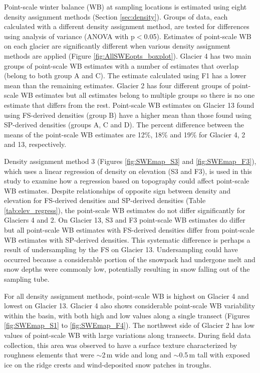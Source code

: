 \documentclass{sfuthesis}
\begin{document}
Point-scale winter balance (WB) at sampling locations is estimated using eight density assignment methods (Section \ref{sec:density}). Groups of data, each calculated with a different density assignment method, are tested for differences using analysis of variance (ANOVA with p$<$0.05). Estimates of point-scale WB on each glacier are significantly different when various density assignment methods are applied (Figure \ref{fig:AllSWEopts_boxplot}). Glacier 4 has two main groups of point-scale WB estimates with a number of estimates that overlap (belong to both group A and C). The estimate calculated using F1 has a lower mean than the remaining estimates. Glacier 2 has four different groups of point-scale WB estimates but all estimates belong to multiple groups so there is no one estimate that differs from the rest. Point-scale WB estimates on Glacier 13 found using FS-derived densities (group B) have a higher mean than those found using SP-derived densities (groups A, C and D). The percent difference between the means of the point-scale WB estimates are 12\%, 18\% and 19\%  for Glacier 4, 2 and 13, respectively. 

Density assignment method 3 (Figures \ref{fig:SWEmap_S3} and \ref{fig:SWEmap_F3}), which uses a linear regression of density on elevation (S3 and F3), is used in this study to examine how a regression based on topography could affect point-scale WB estimates. Despite relationships of opposite sign between density and elevation for FS-derived densities and SP-derived densities (Table \ref{tab:elev_regress}), the point-scale WB estimates do not differ significantly for Glaciers 4 and 2. On Glacier 13, S3 and F3 point-scale WB estimates do differ but all point-scale WB estimates with FS-derived densities differ from point-scale WB estimates with SP-derived densities. This systematic difference is perhaps a result of undersampling by the FS on Glacier 13. Undersampling could have occurred because a considerable portion of the snowpack had undergone melt and snow depths were commonly low, potentially resulting in snow falling out of the sampling tube. 

For all density assignment methods, point-scale WB is highest on Glacier 4 and lowest on Glacier 13. Glacier 4 also shows considerable point-scale WB variability within the basin, with both high and low values along a single transect (Figures \ref{fig:SWEmap_S1} to \ref{fig:SWEmap_F4}). The northwest side of Glacier 2 has low values of point-scale WB with large variations along transects. During field data collection, this area was observed to have a surface texture characterized by roughness elements that were $\sim$2\,m wide and long and $\sim$0.5\,m tall with exposed ice on the ridge crests and wind-deposited snow patches in troughs.
\end{document}
